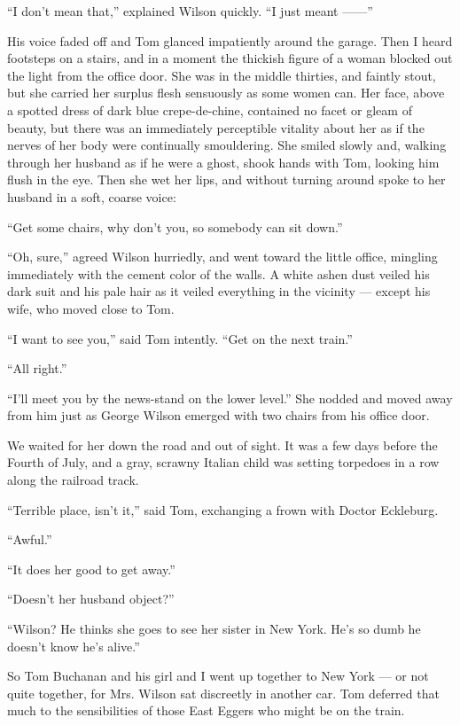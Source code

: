 \documentclass{znotebook}
\begin{document}
``I don’t mean that,'' explained Wilson quickly. ``I just meant ——''

His voice faded off and Tom glanced impatiently around the garage. Then I heard footsteps on a stairs, and in a moment the thickish figure of a woman blocked out the light from the office door. She was in the middle thirties, and faintly stout, but she carried her surplus flesh sensuously as some women can. Her face, above a spotted dress of dark blue crepe-de-chine, contained no facet or gleam of beauty, but there was an immediately perceptible vitality about her as if the nerves of her body were continually smouldering. She smiled slowly and, walking through her husband as if he were a ghost, shook hands with Tom, looking him flush in the eye. Then she wet her lips, and without turning around spoke to her husband in a soft, coarse voice:

``Get some chairs, why don’t you, so somebody can sit down.''

``Oh, sure,'' agreed Wilson hurriedly, and went toward the little office, mingling immediately with the cement color of the walls. A white ashen dust veiled his dark suit and his pale hair as it veiled everything in the vicinity — except his wife, who moved close to Tom.

``I want to see you,'' said Tom intently. ``Get on the next train.''

``All right.''

``I’ll meet you by the news-stand on the lower level.'' She nodded and moved away from him just as George Wilson emerged with two chairs from his office door.

We waited for her down the road and out of sight. It was a few days before the Fourth of July, and a gray, scrawny Italian child was setting torpedoes in a row along the railroad track.

``Terrible place, isn’t it,'' said Tom, exchanging a frown with Doctor Eckleburg.

``Awful.''

``It does her good to get away.''

``Doesn’t her husband object?''

``Wilson? He thinks she goes to see her sister in New York. He’s so dumb he doesn’t know he’s alive.''

So Tom Buchanan and his girl and I went up together to New York — or not quite together, for Mrs. Wilson sat discreetly in another car. Tom deferred that much to the sensibilities of those East Eggers who might be on the train.
\end{document}
